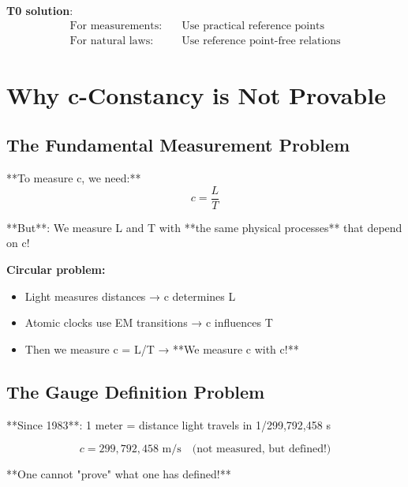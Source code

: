 \documentclass[12pt,a4paper]{article}
\begin{document}
{{{{{{{{{{											\textbf{T0 solution}:
											\begin{align}
												\text{For measurements:} \quad &\text{Use practical reference points} \\
												\text{For natural laws:} \quad &\text{Use reference point-free relations}
											\end{align}
											
											\section{Why c-Constancy is Not Provable}
											
											\subsection{The Fundamental Measurement Problem}
											
											**To measure c, we need:**
											\begin{equation}
												c = \frac{L}{T}
											\end{equation}
											
											**But**: We measure L and T with **the same physical processes** that depend on c!
											
											\textbf{Circular problem:}
											\begin{itemize}
												\item Light measures distances → c determines L
												\item Atomic clocks use EM transitions → c influences T
												\item Then we measure c = L/T → **We measure c with c!**
											\end{itemize}
											
											\subsection{The Gauge Definition Problem}
											
											**Since 1983**: 1 meter = distance light travels in 1/299,792,458 s
											
											\begin{equation}
												c = 299,792,458 \text{ m/s} \quad \text{(not measured, but defined!)}
											\end{equation}
											
											**One cannot "prove" what one has defined!**
											
}}}}}}}}}}
\end{document}
